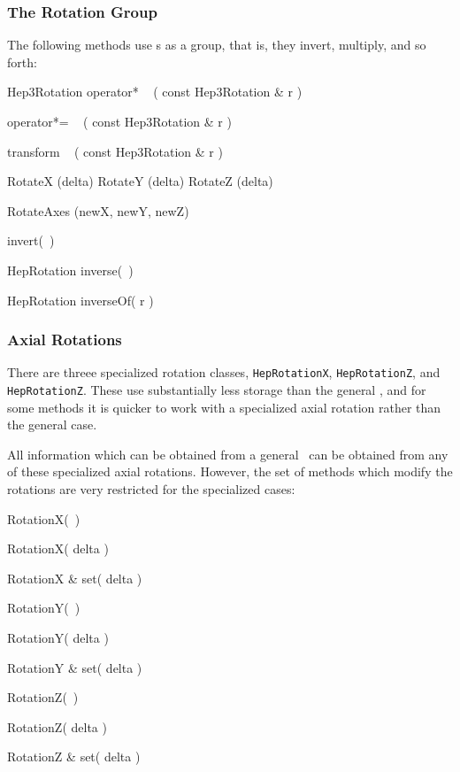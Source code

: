 \subsubsection{The Rotation Group}

The following methods use \Ro s as a group, that is, they invert, multiply, 
and so forth:

\begin{shortlist}
  \item Hep3Rotation operator* ~ ( const Hep3Rotation \& r ) 
		\see{\ref{eq:opmulrot}}
  \item operator*= ~ ( const Hep3Rotation \& r ) 
		\see{\ref{eq:opstrot}}
  \item transform ~ ( const Hep3Rotation \& r ) 
		\see{\ref{eq:transrot}}
  \item RotateX (delta) \/\/\/ RotateY (delta) \/\/\/ RotateZ (delta) 
		\see{\ref{eq:xyzrot}}
  \item RotateAxes (newX, newY, newZ) 
		\see{\ref{eq:rotaxes}}

  \item invert(~)
  \item HepRotation inverse(~)
  \item HepRotation inverseOf( r )


\end{shortlist}

\subsubsection{Axial Rotations}

There are threee specialized rotation classes, {\tt HepRotationX}, 
{\tt HepRotationZ}, and {\tt HepRotationZ}.
These use substantially less storage than the general \Ro, 
and for some methods it is quicker to work with a specialized axial rotation
rather than the general case.

All information which can be obtained from a general \Ro\ can be obtained 
from any of these specialized axial rotations.  
However, the set of methods which modify the rotations are very restricted
for the specialized cases:
\begin{shortlist}
  \item RotationX(~)
  \item RotationX( delta )		\see{\ref{eq:rotX}}
  \item RotationX \& set( delta )	\see{\ref{eq:rotX}}
  \item RotationY(~)
  \item RotationY( delta )		\see{\ref{eq:rotY}}
  \item RotationY \& set( delta )	\see{\ref{eq:rotY}}
  \item RotationZ(~)
  \item RotationZ( delta )		\see{\ref{eq:rotZ}}
  \item RotationZ \& set( delta )	\see{\ref{eq:rotZ}}
\end{shortlist}

